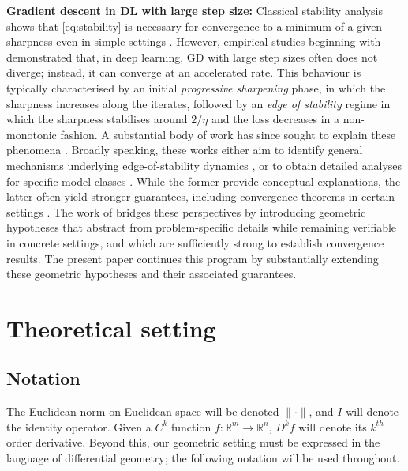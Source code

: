 \documentclass{article}
\newcommand{\RB}{\mathbb{R}}
\theoremstyle{plain}
\theoremstyle{definition}
\theoremstyle{remark}
\begin{document}
\textbf{Gradient descent in DL with large step size:} 
Classical stability analysis shows that \eqref{eq:stability} is necessary for convergence to a minimum of a given sharpness even in simple settings \cite{wudynamicalstability}. However, empirical studies beginning with \cite{coheneos} demonstrated that, in deep learning, GD with large step sizes often does not diverge; instead, it can converge at an accelerated rate. This behaviour is typically characterised by an initial \emph{progressive sharpening} phase, in which the sharpness increases along the iterates, followed by an \emph{edge of stability} regime in which the sharpness stabilises around $2/\eta$ and the loss decreases in a non-monotonic fashion. A substantial body of work has since sought to explain these phenomena \cite{ahneos, aroraeos, wangeos, wang2022eos, wang2023eos, damianeos, leeeos, zhueos, agarwalaeos, chen2023eos, kreislereos, wu2023eos, wu2024eos, cai2024eos, kalraeos, liueos, ghosh2025eos, yooeos, wu2025eos}. Broadly speaking, these works either aim to identify general mechanisms underlying edge-of-stability dynamics \cite{aroraeos, damianeos, cohen2025understanding}, or to obtain detailed analyses for specific model classes \cite{wang2022eos, wang2023eos, zhueos, agarwalaeos, chen2023eos, kreislereos, wu2023eos, wu2024eos, cai2024eos, kalraeos, liueos, yooeos, ghosh2025eos, wu2025eos}. While the former provide conceptual explanations, the latter often yield stronger guarantees, including convergence theorems in certain settings \cite{wu2023eos, wu2024eos, wu2025eos, liueos}. The work of \cite{macdonaldeos} bridges these perspectives by introducing geometric hypotheses that abstract from problem-specific details while remaining verifiable in concrete settings, and which are sufficiently strong to establish convergence results. The present paper continues this program by substantially extending these geometric hypotheses and their associated guarantees.


\section{Theoretical setting}


\subsection{Notation}

The Euclidean norm on Euclidean space will be denoted $\|\cdot\|$, and $I$ will denote the identity operator. Given a $C^k$ function $f:\RB^m\rightarrow\RB^n$, $D^kf$ will denote its $k^{th}$ order derivative. Beyond this, our geometric setting must be expressed in the language of differential geometry; the following notation will be used throughout. 
\end{document}

